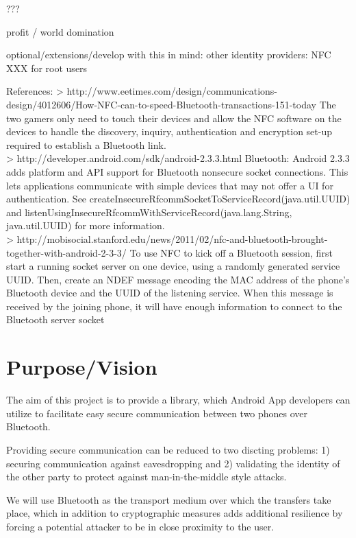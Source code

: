 \documentclass[a4paper,11pt]{article}
\begin{document}
???

profit / world domination


optional/extensions/develop with this in mind:
other identity providers: NFC
XXX for root users

References:
> http://www.eetimes.com/design/communications-design/4012606/How-NFC-can-to-speed-Bluetooth-transactions-151-today
The two gamers only need to touch their devices and allow the NFC software on the devices to handle the discovery, inquiry, authentication and encryption set-up required to establish a Bluetooth link.\\
> http://developer.android.com/sdk/android-2.3.3.html
Bluetooth: Android 2.3.3 adds platform and API support for Bluetooth nonsecure socket connections. This lets applications communicate with simple devices that may not offer a UI for authentication. See createInsecureRfcommSocketToServiceRecord(java.util.UUID) and listenUsingInsecureRfcommWithServiceRecord(java.lang.String, java.util.UUID) for more information.\\
> http://mobisocial.stanford.edu/news/2011/02/nfc-and-bluetooth-brought-together-with-android-2-3-3/
To use NFC to kick off a Bluetooth session, first start a running socket server on one device, using a randomly generated service UUID. Then, create an NDEF message encoding the MAC address of the phone’s Bluetooth device and the UUID of the listening service. When this message is received by the joining phone, it will have enough information to connect to the Bluetooth server socket




\pagebreak 

\section{Purpose/Vision} %
\label{sec:purpose_vision}

The aim of this project is to provide a library, which Android App developers can utilize to facilitate easy secure communication between two phones over Bluetooth.

Providing secure communication can be reduced to two discting problems: 1) securing communication against eavesdropping and 2) validating the identity of the other party to protect against man-in-the-middle style attacks.

We will use Bluetooth as the transport medium over which the transfers take place, which in addition to cryptographic measures adds additional resilience by forcing a potential attacker to be in close proximity to the user.
\end{document}
